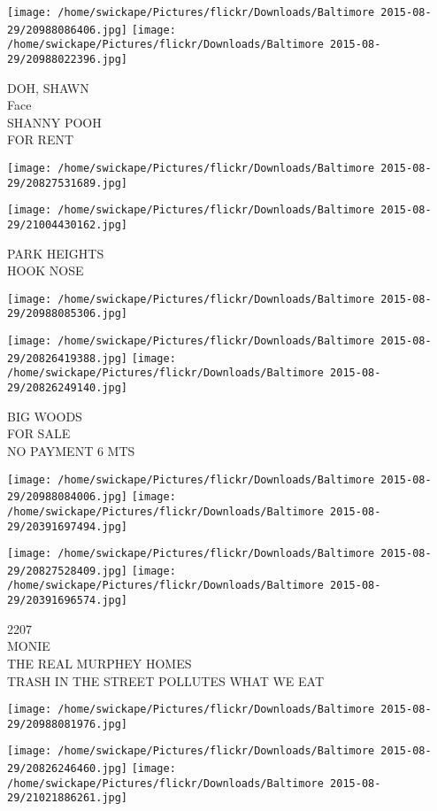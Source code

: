 \documentclass[10pt,letterpaper]{article}
\begin{document}
\texttt{[image: /home/swickape/Pictures/flickr/Downloads/Baltimore 2015-08-29/20988086406.jpg]}
\texttt{[image: /home/swickape/Pictures/flickr/Downloads/Baltimore 2015-08-29/20988022396.jpg]}

DOH, SHAWN\\
Face\\
SHANNY POOH\\
FOR RENT
\pagebreak

\texttt{[image: /home/swickape/Pictures/flickr/Downloads/Baltimore 2015-08-29/20827531689.jpg]}

\vspace{0.25in}
\texttt{[image: /home/swickape/Pictures/flickr/Downloads/Baltimore 2015-08-29/21004430162.jpg]}

PARK HEIGHTS\\
HOOK NOSE
\pagebreak

\texttt{[image: /home/swickape/Pictures/flickr/Downloads/Baltimore 2015-08-29/20988085306.jpg]}

\vspace{0.25in}
\texttt{[image: /home/swickape/Pictures/flickr/Downloads/Baltimore 2015-08-29/20826419388.jpg]}
\texttt{[image: /home/swickape/Pictures/flickr/Downloads/Baltimore 2015-08-29/20826249140.jpg]}

BIG WOODS\\
FOR SALE\\
NO PAYMENT 6 MTS
\pagebreak

\texttt{[image: /home/swickape/Pictures/flickr/Downloads/Baltimore 2015-08-29/20988084006.jpg]}
\texttt{[image: /home/swickape/Pictures/flickr/Downloads/Baltimore 2015-08-29/20391697494.jpg]}

\texttt{[image: /home/swickape/Pictures/flickr/Downloads/Baltimore 2015-08-29/20827528409.jpg]}
\texttt{[image: /home/swickape/Pictures/flickr/Downloads/Baltimore 2015-08-29/20391696574.jpg]}

2207\\
MONIE\\
THE REAL MURPHEY HOMES\\
TRASH IN THE STREET POLLUTES WHAT WE EAT
\pagebreak

\texttt{[image: /home/swickape/Pictures/flickr/Downloads/Baltimore 2015-08-29/20988081976.jpg]}

\vspace{0.25in}
\texttt{[image: /home/swickape/Pictures/flickr/Downloads/Baltimore 2015-08-29/20826246460.jpg]}
\texttt{[image: /home/swickape/Pictures/flickr/Downloads/Baltimore 2015-08-29/21021886261.jpg]}
\end{document}
